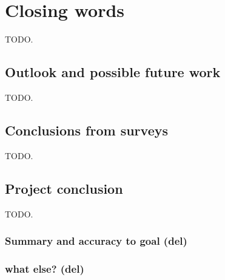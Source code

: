 
\chapter{Closing words}\label{chapter:outlook}
TODO.
\section{Outlook and possible future work}
TODO.
\section{Conclusions from surveys}
TODO.
\section{Project conclusion}
TODO.
\subsection{Summary and accuracy to goal (del)}
\subsection{what else? (del)}